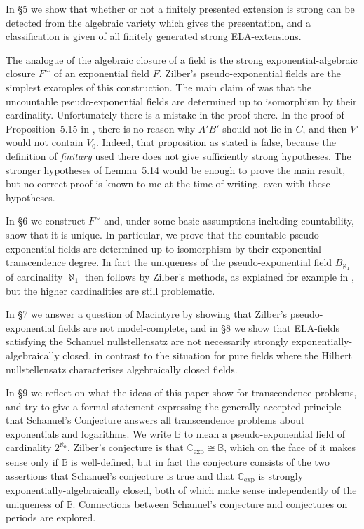 \documentclass[12pt]{amsart}
\theoremstyle{definition}
\begin{document}
In \S5 we show that whether or not a finitely presented extension is strong can be detected from the algebraic variety which gives the presentation, and a classification is given of all finitely generated strong ELA-extensions.

The analogue of the algebraic closure of a field is the strong exponential-algebraic closure ${\ensuremath{{{F}}^\sim}}$ of an exponential field $F$.
Zilber's pseudo-exponential fields are the simplest examples of this construction. The main claim of \cite{Zilber05peACF0} was that the uncountable pseudo-exponential fields are determined up to isomorphism by their cardinality. Unfortunately there is a mistake in the proof there. In the proof of Proposition~5.15 in \cite{Zilber05peACF0}, there is no reason why $A'B'$ should not lie in $C$, and then $V'$ would not contain $V_0$. Indeed, that proposition as stated is false, because the definition of \emph{finitary} used there does not give sufficiently strong hypotheses. The stronger hypotheses of Lemma~5.14 would be enough to prove the main result, but no correct proof is known to me at the time of writing, even with these hypotheses.

In \S6 we construct ${\ensuremath{{{F}}^\sim}}$ and, under some basic assumptions including countability, show that it is unique. In particular, we prove that the countable pseudo-exponential fields are determined up to isomorphism by their exponential transcendence degree. In fact the uniqueness of the pseudo-exponential field $B_{\aleph_1}$ of cardinality $\aleph_1$ then follows by Zilber's methods, as explained  for example in \cite[Theorem~2.1]{OQMEC}, but the higher cardinalities are still problematic. 

In \S7 we answer a question of Macintyre by showing that Zilber's pseudo-exponential fields are not model-complete, and in \S8 we show that ELA-fields satisfying the Schanuel nullstellensatz are not necessarily {strongly exponentially-algebraically closed}, in contrast to the situation for pure fields where the Hilbert nullstellensatz characterises algebraically closed fields.

In \S9 we reflect on what the ideas of this paper show for transcendence problems, and try to give a formal statement expressing the generally accepted principle that Schanuel's Conjecture answers all transcendence problems about exponentials and logarithms. We write ${\ensuremath{\mathbb{B}}}$ to mean a pseudo-exponential field of cardinality $2^{\aleph_0}$. Zilber's conjecture is that ${\ensuremath{\mathbb{C}_{\mathrm{exp}}}} {\cong} {\ensuremath{\mathbb{B}}}$, which on the face of it makes sense only if ${\ensuremath{\mathbb{B}}}$ is well-defined, but in fact the conjecture consists of the two assertions that Schanuel's conjecture is true and that ${\ensuremath{\mathbb{C}_{\mathrm{exp}}}}$ is {strongly exponentially-algebraically closed}, both of which make sense independently of the uniqueness of ${\ensuremath{\mathbb{B}}}$. Connections between Schanuel's conjecture and conjectures on periods are explored.
\end{document}
